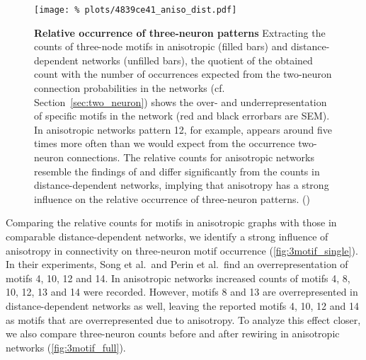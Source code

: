 \begin{figure}[H]
  \centering
  \texttt{[image: \%
    plots/4839ce41\_aniso\_dist.pdf]}
  \captionsetup{skip=8pt}
  \caption{\textbf{Relative occurrence of three-neuron patterns}
    Extracting the counts of three-node motifs in anisotropic (filled
    bars) and distance-dependent networks (unfilled bars), the
    quotient of the obtained count with the number of occurrences
    expected from the two-neuron connection probabilities in the
    networks (cf. Section~\ref{sec:two_neuron}) shows the over- and
    underrepresentation of specific motifs in the network (red and
    black errorbars are SEM). In anisotropic networks pattern 12, for
    example, appears around five times more often than we would expect
    from the occurrence two-neuron connections. The relative counts
    for anisotropic networks resemble the findings of
    \textcite{Song2005} and differ significantly from the counts in
    distance-dependent networks, implying that anisotropy has a strong
    influence on the relative occurrence of three-neuron
    patterns. () }
  \label{fig:3motif_single}
\end{figure}

Comparing the relative counts for motifs in anisotropic graphs with
those in comparable distance-dependent networks, we
identify a strong influence of anisotropy in connectivity
on three-neuron motif occurrence (\autoref{fig:3motif_single}). In
their experiments, Song et al.\ and Perin et al.\ find an
overrepresentation of motifs 4, 10, 12 and 14. In anisotropic networks
increased counts of motifs 4, 8, 10, 12, 13 and 14 were
recorded. However, motifs 8 and 13 are overrepresented in
distance-dependent networks as well, leaving the reported motifs 4,
10, 12 and 14 as motifs that are overrepresented due to anisotropy. To
analyze this effect closer, we also compare three-neuron counts before
and after rewiring in anisotropic networks
(\autoref{fig:3motif_full}).


